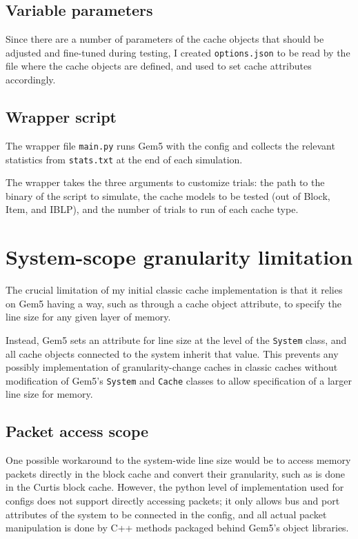\documentclass[12pt,twoside]{reedthesis}
\begin{document}
	\subsection*{Variable parameters}

	Since there are a number of parameters of the cache objects that should be adjusted and fine-tuned during testing, I created \verb`options.json` to be read by the file where the cache objects are defined, and used to set cache attributes accordingly.

	\subsection*{Wrapper script}

	The wrapper file \verb`main.py` runs Gem5 with the config and collects the relevant statistics from \verb`stats.txt` at the end of each simulation.

	The wrapper takes the three arguments to customize trials: the path to the binary of the script to simulate, the cache models to be tested (out of Block, Item, and IBLP), and the number of trials to run of each cache type.

\section{System-scope granularity limitation}

	The crucial limitation of my initial classic cache implementation is that it relies on Gem5 having a way, such as through a cache object attribute, to specify the line size for any given layer of memory.

	Instead, Gem5 sets an attribute for line size at the level of the \verb`System` class, and all cache objects connected to the system inherit that value. This prevents any possibly implementation of granularity-change caches in classic caches without modification of Gem5's \verb`System` and \verb`Cache` classes to allow specification of a larger line size for memory.

	\subsection*{Packet access scope}

	One possible workaround to the system-wide line size would be to access memory packets directly in the block cache and convert their granularity, such as is done in the Curtis block cache. However, the python level of implementation used for configs does not support directly accessing packets; it only allows bus and port attributes of the system to be connected in the config, and all actual packet manipulation is done by C++ methods packaged behind Gem5's object libraries.
\end{document}
